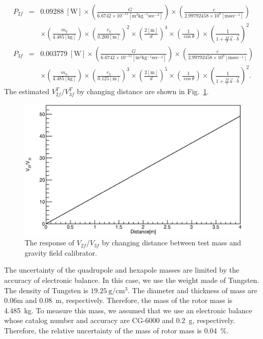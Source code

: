 \documentclass[A4]{spie}  %
\begin{document}
\begin{eqnarray}
P_{2f}&=&0.09288 ~\mathrm{[W]}\times \left( \frac{G}{6.6742 \times 10^{-11} \mathrm{[m^3kg^{-1}sec^{-2}]}} \right)\times \left( \frac{c}{2.99792458 \times 10^{8} \mathrm{[m sec^{-1}]}} \right) \nonumber \\
&& \times \left( \frac{m_q}{4.485 \mathrm{[kg]}} \right) \times \left( \frac{r_q}{0.200 \mathrm{[m]}} \right)^2 \times \left( \frac{2\mathrm{[m]}}{d} \right)^4 \times \left( \frac{1}{\cos{\theta}} \right) \times \left( \frac{1}{1+\frac{M}{I}\vec{a}\cdot \vec{b}} \right)^2\\
P_{3f}&=&0.003779~\mathrm{[W]} \times \left( \frac{G}{6.6742 \times 10^{-11} \mathrm{[m^3kg^{-1}sec^{-2}]}} \right)\times \left( \frac{c}{2.99792458 \times 10^{8} \mathrm{[m sec^{-1}]}} \right) \nonumber \\
&& \times \left( \frac{m_h}{4.485 \mathrm{[kg]}} \right) \times \left( \frac{r_h}{0.125 \mathrm{[m]}} \right)^3 \times \left( \frac{2\mathrm{[m]}}{d} \right)^5 \times \left( \frac{1}{\cos{\theta}} \right) \times \left( \frac{1}{1+\frac{M}{I}\vec{a}\cdot \vec{b}} \right)^2.
\end{eqnarray}
The estimated $V^T_{2f}/V^{T}_{3f}$ by changing distance are shown in Fig.~\ref{fig:dvsVV}.

\begin{figure}
\begin{center}
\includegraphics[width=12cm]{dvsVV.eps}
\caption{The response of $V_{2f}/V_{3f}$ by changing distance between test mass and gravity field calibrator.}
\label{fig:dvsVV}
\end{center}
\end{figure}
The uncertainty of the quadrupole and hexapole masses are limited by the accuracy of electronic balance. In this case, we use the weight made of Tungsten. The density of Tungsten is $19.25~\mathrm{g/cm^3}$. The diameter and thickness of mass are 0.06m and 0.08~m, respectively. Therefore, the mass of the rotor mass is 4.485~kg. To measure this mass, we assumed that we use an electronic balance whose catalog number and accuracy are CG-6000 and 0.2~g, respectively. Therefore, the relative uncertainty of the mass of rotor mass is 0.04~\%.
\end{document}
